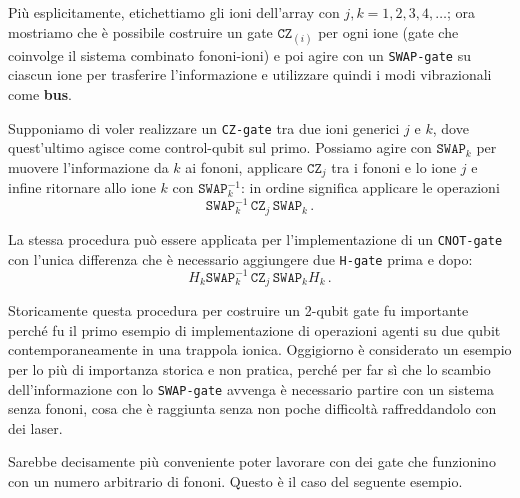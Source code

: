 \noindent Più esplicitamente, etichettiamo gli ioni dell'array con $j,k = 1, 2, 3, 4, \ldots$; ora mostriamo che è possibile costruire un gate $\texttt{CZ}_{(i)}$ per ogni ione (gate che coinvolge il sistema combinato fononi-ioni) e poi agire con un \texttt{SWAP-gate} su ciascun ione per trasferire l'informazione e utilizzare quindi i modi vibrazionali come \textbf{bus}. 

\begin{esempio}
    Supponiamo di voler realizzare un \texttt{CZ-gate} tra due ioni generici $j$ e $k$, dove quest'ultimo agisce come control-qubit sul primo. Possiamo agire con $\texttt{SWAP}_k$ per muovere l'informazione da $k$ ai fononi, applicare $\texttt{CZ}_j$ tra i fononi e lo ione $j$ e infine ritornare allo ione $k$ con $\texttt{SWAP}^{-1}_k$: in ordine significa applicare le operazioni
    \begin{equation*}
        \texttt{SWAP}^{-1}_k \, \texttt{CZ}_j \, \texttt{SWAP}_k \, .
    \end{equation*}
    
    \noindent La stessa procedura può essere applicata per l'implementazione di un \texttt{CNOT-gate} con l'unica differenza che è necessario aggiungere due \texttt{H-gate} prima e dopo: 
    \begin{equation*}
        H_k \texttt{SWAP}^{-1}_k \, \texttt{CZ}_j \, \texttt{SWAP}_k H_k \, .
    \end{equation*}
\end{esempio}

\noindent Storicamente questa procedura per costruire un 2-qubit gate fu importante perché fu il primo esempio di implementazione di operazioni agenti su due qubit contemporaneamente in una trappola ionica. Oggigiorno è considerato un esempio per lo più di importanza storica e non pratica, perché per far sì che lo scambio dell'informazione con lo \texttt{SWAP-gate} avvenga è necessario partire con un sistema senza fononi, cosa che è raggiunta senza non poche difficoltà raffreddandolo con dei laser.   

\noindent Sarebbe decisamente più conveniente poter lavorare con dei gate che funzionino con un numero arbitrario di fononi. Questo è il caso del seguente esempio.

